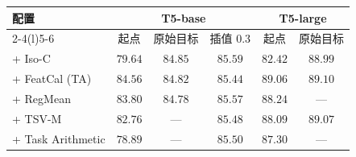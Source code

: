\begin{tabular}{@{}lccccc@{}}
\toprule
配置 & \multicolumn{3}{c}{T5-base} & \multicolumn{2}{c}{T5-large} \\
\cmidrule(lr){2-4}\cmidrule(l){5-6}
 & 起点 & \method{} 原始目标 & \method{} 插值 0.3 & 起点 & \method{} 原始目标 \\
\midrule
\method{} + Iso-C & $79.64$ & $84.85$ & $85.59$ & $82.42$ & $88.99$ \\
\method{} + FeatCal (TA) & $84.56$ & $84.82$ & $85.44$ & $89.06$ & $89.10$ \\
\method{} + RegMean & $83.80$ & $84.78$ & $85.57$ & $88.24$ & --- \\
\method{} + TSV-M & $82.76$ & --- & $85.48$ & $88.09$ & $89.07$ \\
\method{} + Task Arithmetic & $78.89$ & --- & $85.50$ & $87.30$ & --- \\
\bottomrule
\end{tabular}
